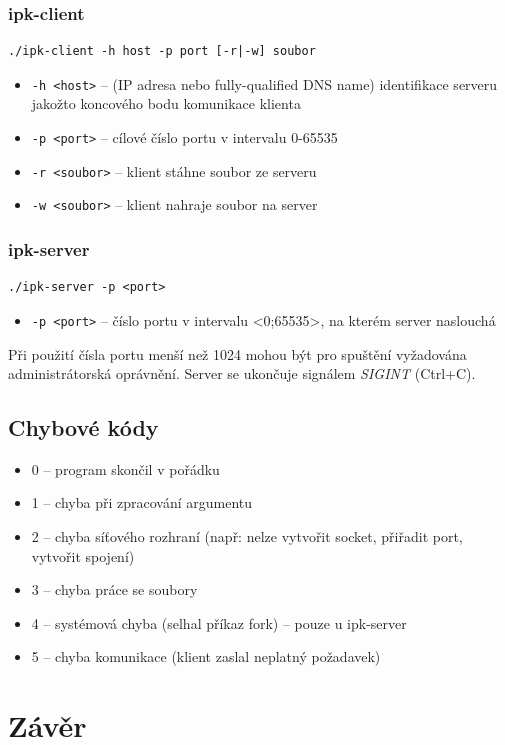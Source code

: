 \documentclass[11pt,a4paper]{article}
\begin{document}
\subsubsection*{ipk-client}
\begin{lstlisting}
./ipk-client -h host -p port [-r|-w] soubor
\end{lstlisting}
\begin{itemize}
	\item \texttt{-h <host>} -- (IP adresa nebo fully-qualified DNS name) identifikace serveru jakožto koncového bodu komunikace klienta
	\item \texttt{-p <port>} -- cílové číslo portu v intervalu 0-65535
	\item \texttt{-r <soubor>} -- klient stáhne soubor ze serveru
	\item \texttt{-w <soubor>} -- klient nahraje soubor na server
\end{itemize}

\subsubsection*{ipk-server}
\begin{lstlisting}
./ipk-server -p <port>
\end{lstlisting}
\begin{itemize}
	\item \texttt{-p <port>} -- číslo portu v intervalu <0;65535>, na kterém server naslouchá
\end{itemize}
Při použití čísla portu menší než 1024 mohou být pro spuštění vyžadována administrátorská oprávnění. Server se ukončuje signálem \textit{SIGINT} (Ctrl+C).

\subsection{Chybové kódy}
\begin{itemize}
	\item 0 -- program skončil v pořádku
	\item 1 -- chyba při zpracování argumentu
	\item 2 -- chyba síťového rozhraní (např: nelze vytvořit socket, přiřadit port, vytvořit spojení)
	\item 3 -- chyba práce se soubory
	\item 4 -- systémová chyba (selhal příkaz fork) -- pouze u ipk-server
	\item 5 -- chyba komunikace (klient zaslal neplatný požadavek)
\end{itemize}
\section{Závěr}
\end{document}
